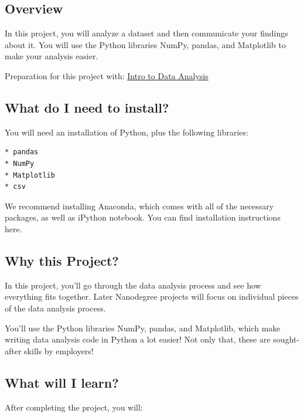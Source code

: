 \documentclass[]{book}
\begin{document}
\subsection{Overview}\label{overview-1}

In this project, you will analyze a dataset and then communicate your
findings about it. You will use the Python libraries NumPy, pandas, and
Matplotlib to make your analysis easier.

Preparation for this project with:
\href{https://classroom.udacity.com/courses/ud170-nd}{Intro to Data
Analysis}

\subsection{What do I need to install?}\label{what-do-i-need-to-install}

You will need an installation of Python, plus the following libraries:

\begin{verbatim}
* pandas
* NumPy
* Matplotlib
* csv
\end{verbatim}

We recommend installing Anaconda, which comes with all of the necessary
packages, as well as iPython notebook. You can find installation
instructions here.

\subsection{Why this Project?}\label{why-this-project}

In this project, you'll go through the data analysis process and see how
everything fits together. Later Nanodegree projects will focus on
individual pieces of the data analysis process.

You'll use the Python libraries NumPy, pandas, and Matplotlib, which
make writing data analysis code in Python a lot easier! Not only that,
these are sought-after skills by employers!

\subsection{What will I learn?}\label{what-will-i-learn}

After completing the project, you will:
\end{document}
